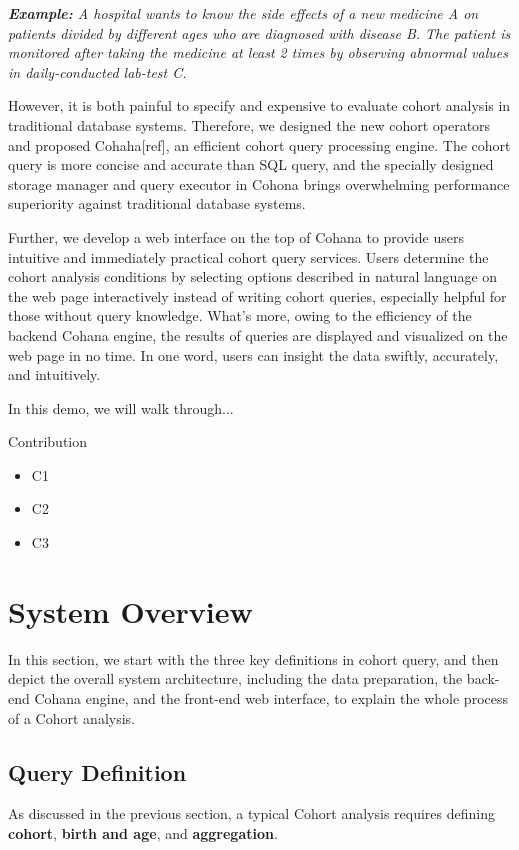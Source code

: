 \documentclass[10pt,conference,letterpaper]{IEEEtran}
\begin{document}
\emph{\textbf{Example:} A hospital wants to know the side effects of a new medicine A on patients divided by different ages who are diagnosed with disease B. The patient is monitored after taking the medicine at least 2 times by observing abnormal values in daily-conducted lab-test C.}

However, it is both painful to specify and expensive to evaluate cohort analysis in traditional database systems. Therefore, we designed the new cohort operators and proposed Cohaha[ref], an efficient cohort query processing engine. The cohort query is more concise and accurate than SQL query, and the specially designed storage manager and query executor in Cohona brings overwhelming performance superiority against traditional database systems. 

Further, we develop a web interface on the top of Cohana to provide users intuitive and immediately practical cohort query services. Users determine the cohort analysis conditions by selecting options described in natural language on the web page interactively instead of writing cohort queries, especially helpful for those without query knowledge. What's more, owing to the efficiency of the backend Cohana engine, the results of queries are displayed and visualized on the web page in no time. In one word, users can insight the data swiftly, accurately, and intuitively. 

In this demo, we will walk through...

Contribution
\begin{itemize}
\item	C1
\item   C2
\item   C3
\end{itemize}

\section{System Overview}
In this section, we start with the three key definitions in cohort query, and then depict the overall system architecture, including the data preparation, the back-end Cohana engine, and the front-end web interface, to explain the whole process of a Cohort analysis.  

\subsection{Query Definition}
As discussed in the previous section, a typical Cohort analysis requires defining \textbf{cohort}, \textbf{birth and age}, and \textbf{aggregation}. 
\end{document}
